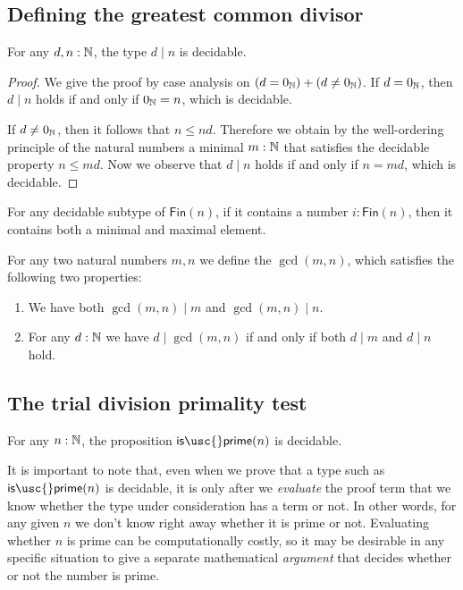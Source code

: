 \subsection{Defining the greatest common divisor}

\begin{lem}
  For any $d,n:{\mathbb{N}}$, the type $d\mid n$ is decidable.
\end{lem}

\begin{proof}
  We give the proof by case analysis on $(d=0_{{\mathbb{N}}})+(d\neq0_{{\mathbb{N}}})$. If $d=0_{{\mathbb{N}}}$, then $d\mid n$ holds if and only if $0_{{\mathbb{N}}}=n$, which is decidable.

  If $d\neq0_{{\mathbb{N}}}$, then it follows that $n\leq nd$. Therefore we obtain by the well-ordering principle of the natural numbers a minimal $m:{\mathbb{N}}$ that satisfies the decidable property $n\leq md$. Now we observe that $d\mid n$ holds if and only if $n=md$, which is decidable.
\end{proof}

\begin{lem}
  For any decidable subtype of $\mathsf{Fin}(n)$, if it contains a number $i:\mathsf{Fin}(n)$, then it contains both a minimal and maximal element.
\end{lem}

\begin{defn}
  For any two natural numbers $m,n$ we define the  $\gcd(m,n)$, which satisfies the following two properties:
  \begin{enumerate}
  \item We have both $\gcd(m,n)\mid m$ and $\gcd(m,n)\mid n$.
  \item For any $d:{\mathbb{N}}$ we have $d\mid \gcd(m,n)$ if and only if both $d\mid m$ and $d\mid n$ hold.
  \end{enumerate}
\end{defn}

\subsection{The trial division primality test}

\begin{thm}
  For any $n:{\mathbb{N}}$, the proposition $\mathsf{is\usc{}prime}(n)$ is decidable.
\end{thm}

It is important to note that, even when we prove that a type such as $\mathsf{is\usc{}prime}(n)$ is decidable, it is only after we \emph{evaluate} the proof term that we know whether the type under consideration has a term or not. In other words, for any given $n$ we don't know right away whether it is prime or not. Evaluating whether $n$ is prime can be computationally costly, so it may be desirable in any specific situation to give a separate mathematical \emph{argument} that decides whether or not the number is prime.

